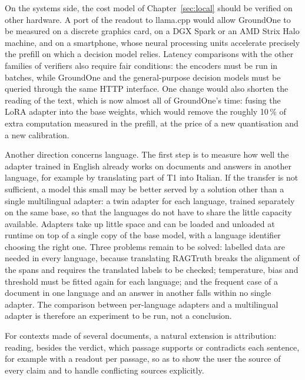 On the systems side, the cost model of Chapter~\ref{sec:local} should be verified on other hardware. A port of the
readout to llama.cpp would allow GroundOne to be measured on a discrete graphics card, on a DGX Spark or an AMD Strix Halo
machine, and on a smartphone, whose neural processing units accelerate precisely the prefill on which a decision model
relies. Latency comparisons with the other families of verifiers also require fair conditions: the encoders must be run
in batches, while GroundOne and the general-purpose decision models must be queried through the same HTTP interface. One change would also shorten the reading of the text, which is now almost all of GroundOne's time: fusing the LoRA adapter into the base weights, which would remove the roughly 10\,\% of extra computation measured in the prefill, at the price of a new quantisation and a new calibration.

Another direction concerns language. The first step is to measure how well the adapter trained in English already works
on documents and answers in another language, for example by translating part of T1 into Italian. If the transfer is not
sufficient, a model this small may be better served by a solution other than a single multilingual adapter: a twin
adapter for each language, trained separately on the same base, so that the languages do not have to share the little
capacity available. Adapters take up little space and can be loaded and unloaded at runtime on top of a single copy of
the base model, with a language identifier choosing the right one. Three problems remain to be solved: labelled data are
needed in every language, because translating RAGTruth breaks the alignment of the spans and requires the translated
labels to be checked; temperature, bias and threshold must be fitted again for each language; and the frequent case of a
document in one language and an answer in another falls within no single adapter. The comparison between per-language
adapters and a multilingual adapter is therefore an experiment to be run, not a conclusion.

For contexts made of several documents, a natural extension is attribution: reading, besides the verdict, which passage
supports or contradicts each sentence, for example with a readout per passage, so as to show the user the source of every
claim and to handle conflicting sources explicitly.

